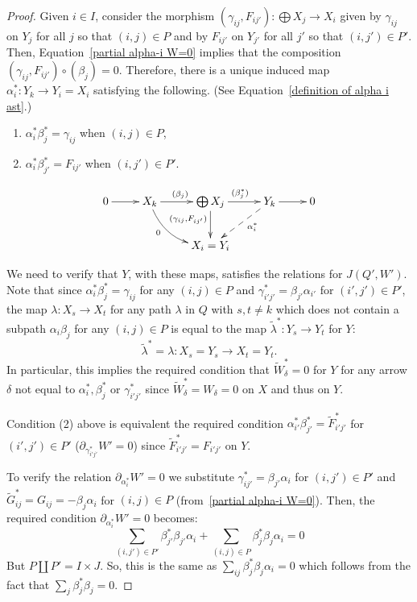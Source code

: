 \documentclass[10pt]{amsart}
\theoremstyle{definition}
\begin{document}
\begin{proof}
Given $i\in I$, consider the morphism ${(\gamma_{ij},F_{ij'})}:\bigoplus X_j\to X_i$ given by $\gamma_{ij}$ on $Y_j$ for all $j$ so that $(i,j)\in P$ and by $F_{ij'}$ on $Y_{j'}$ for all $j'$ so that $(i,j')\in P'$. Then, Equation~\eqref{partial alpha-i W=0} implies that the composition ${(\gamma_{ij},F_{ij'})}\circ (\beta_j)=0$. Therefore, there is a unique induced map $\alpha_i^\ast:Y_k\to Y_i=X_i$ satisfying the following. (See Equation~\eqref{definition of alpha i ast}.)
\begin{enumerate}
\item\label{proof_lemma2.11_1} $\alpha_i^\ast \beta_j^\ast=\gamma_{ij}$ when $(i,j)\in P$,
\item\label{proof_lemma2.11_2} $\alpha_i^\ast \beta_{j'}^\ast=F_{ij'}$ when $(i,j')\in P'$.
\end{enumerate}
\begin{equation}\label{definition of alpha i ast}
\xymatrix{%
0 \ar[r] &
	X_k\ar@/_1pc/[rd]_(.35)0\ar[r]^{(\beta_j)} &
	\bigoplus X_j\ar[d]_(.4){(\gamma_{ij},F_{ij'})}\ar[r]^{(\beta_j^\ast)}&
Y_k \ar[r]\ar@{-->}[dl]^(.4){\alpha_i^\ast}& 0\\
 &  & X_i=Y_i &  
	}%
\end{equation}

We need to verify that $Y$, with these maps, satisfies the relations for $J(Q',W')$. Note that since $\alpha_i^\ast \beta_j^\ast=\gamma_{ij}$ for any $(i,j)\in P$ and $\gamma_{i'j'}^\ast= \beta_{j'}\alpha_{i'}$ for $(i',j')\in P'$, the map $\lambda:X_s\to X_t$ for any path $\lambda$ in $Q$ with $s,t\neq k$ which does not contain a subpath $\alpha_i \beta_j$ for any $(i,j)\in P$ is equal to the map $\widetilde\lambda^\ast:Y_s\to Y_t$ for $Y$:
\[
	\widetilde\lambda^\ast=\lambda:X_s=Y_s\to X_t=Y_t.
\]
In particular, this implies the required condition that $\widetilde W_\delta^\ast=0$ for $Y$ for any arrow $\delta$ not equal to $\alpha_i^\ast,\beta_j^\ast$ or $\gamma_{i'j'}^\ast$ since $\widetilde W_\delta^\ast=W_\delta=0$ on $X$ and thus on $Y$.

Condition (2) above is equivalent the required condition $\alpha_{i'}^\ast \beta_{j'}^\ast=\widetilde F^\ast_{i'j'}$ for $(i',j')\in P'$ ($\partial_{\gamma_{i'j'}^\ast}W'=0$) since $\widetilde F^\ast_{i'j'}= F_{i'j'}$ on $Y$.

To verify the relation $\partial_{\alpha_i^\ast}W'=0$ we substitute $\gamma_{ij'}^\ast=\beta_{j'}\alpha_i$ for $(i,j')\in P'$ and $\widetilde G_{ij}^\ast=G_{ij}=-\beta_j\alpha_i$ for $(i,j)\in P$ (from~\eqref{partial alpha-i W=0}). Then, the required condition $\partial_{\alpha_i^\ast}W'=0$ becomes:
\[
	\sum_{(i,j')\in P'}\beta_{j'}^\ast\beta_{j'}\alpha_i+\sum_{(i,j)\in P}\beta_j^\ast\beta_j\alpha_i=0
\]
But $P\coprod P'=I\times J$. So, this is the same as $\sum_{ij} \beta_j^\ast\beta_j\alpha_i=0$ which follows from the fact that $\sum_j\beta_j^\ast\beta_j=0$.


\end{proof}
\end{document}
